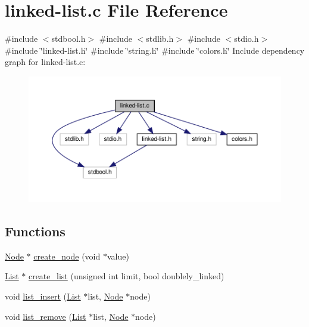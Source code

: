 \hypertarget{linked-list_8c}{}\section{linked-\/list.c File Reference}
\label{linked-list_8c}
{\ttfamily \#include $<$stdbool.\+h$>$}\newline
{\ttfamily \#include $<$stdlib.\+h$>$}\newline
{\ttfamily \#include $<$stdio.\+h$>$}\newline
{\ttfamily \#include \char`\"{}linked-\/list.\+h\char`\"{}}\newline
{\ttfamily \#include \char`\"{}string.\+h\char`\"{}}\newline
{\ttfamily \#include \char`\"{}colors.\+h\char`\"{}}\newline
Include dependency graph for linked-\/list.c\+:\nopagebreak
\begin{figure}[H]
\begin{center}
\leavevmode
\includegraphics[width=350pt]{linked-list_8c__incl}
\end{center}
\end{figure}
\subsection*{Functions}
\begin{DoxyCompactItemize}
\item 
\hyperlink{structNode}{Node} $\ast$ \hyperlink{linked-list_8c_a45dfa9366701eddf667fd95d05cc3be0}{create\+\_\+node} (void $\ast$value)
\item 
\hyperlink{structList}{List} $\ast$ \hyperlink{linked-list_8c_abd16529dbe0922996788f10925823eea}{create\+\_\+list} (unsigned int limit, bool doublely\+\_\+linked)
\item 
void \hyperlink{linked-list_8c_a947069a28d8173531d9186a74e82fb62}{list\+\_\+insert} (\hyperlink{structList}{List} $\ast$list, \hyperlink{structNode}{Node} $\ast$node)
\item 
void \hyperlink{linked-list_8c_ad17dd6e2d3e64d3e9665f313ffb808a1}{list\+\_\+remove} (\hyperlink{structList}{List} $\ast$list, \hyperlink{structNode}{Node} $\ast$node)
\end{DoxyCompactItemize}


